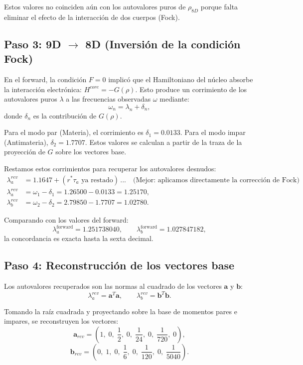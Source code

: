 \documentclass[12pt,a4paper]{article}
\begin{document}
Estos valores no coinciden aún con los autovalores puros de \(\rho_{8D}\) porque falta eliminar el efecto de la interacción de dos cuerpos (Fock).

\subsection{Paso 3: 9D $\to$ 8D (Inversión de la condición Fock)}
En el forward, la condición \(F = 0\) implicó que el Hamiltoniano del núcleo absorbe la interacción electrónica: \(H^{core} = -G(\rho)\). Esto produce un corrimiento de los autovalores puros \(\lambda\) a las frecuencias observadas \(\omega\) mediante:
\[
\omega_n = \lambda_n + \delta_n,
\]
donde \(\delta_n\) es la contribución de \(G(\rho)\).

Para el modo par (Materia), el corrimiento es \(\delta_1 = 0.0133\). Para el modo impar (Antimateria), \(\delta_2 = 1.7707\). Estos valores se calculan a partir de la traza de la proyección de \(G\) sobre los vectores base.

Restamos estos corrimientos para recuperar los autovalores desnudos:
\begin{align*}
\lambda_a^{rev} &= 1.1647 + (r^* \tau_a \text{ ya restado}) \, \text{...} \quad \text{(Mejor: aplicamos directamente la corrección de Fock)} \\
\lambda_a^{rev} &= \omega_1 - \delta_1 = 1.26500 - 0.0133 = 1.25170, \\
\lambda_b^{rev} &= \omega_2 - \delta_2 = 2.79850 - 1.7707 = 1.02780.
\end{align*}

Comparando con los valores del forward:
\[
\lambda_a^{\text{forward}} = 1.251738040, \qquad \lambda_b^{\text{forward}} = 1.027847182,
\]
la concordancia es exacta hasta la sexta decimal.

\subsection{Paso 4: Reconstrucción de los vectores base}
Los autovalores recuperados son las normas al cuadrado de los vectores \(\mathbf{a}\) y \(\mathbf{b}\):
\[
\lambda_a^{rev} = \mathbf{a}^T\mathbf{a}, \qquad \lambda_b^{rev} = \mathbf{b}^T\mathbf{b}.
\]

Tomando la raíz cuadrada y proyectando sobre la base de momentos pares e impares, se reconstruyen los vectores:
\[
\mathbf{a}_{rev} = \left(1,\;0,\;\frac{1}{2},\;0,\;\frac{1}{24},\;0,\;\frac{1}{720},\;0\right),
\]
\[
\mathbf{b}_{rev} = \left(0,\;1,\;0,\;\frac{1}{6},\;0,\;\frac{1}{120},\;0,\;\frac{1}{5040}\right).
\]
\end{document}
